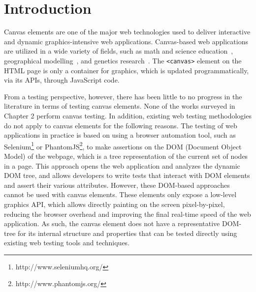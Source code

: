 \section{Introduction}\label{sec:introduction}
Canvas elements are one of the major web technologies used to deliver interactive and dynamic graphics-intensive web applications. Canvas-based web applications are utilized in a wide variety of fields, such as math and science education~\cite{arreola2017creating}, geographical modelling~\cite{christen2012web}, and genetics research~\cite{buels2016jbrowse}. 
The \texttt{<canvas>} element on the HTML page is only a container for graphics, which is updated programmatically, via its APIs, through JavaScript code.

From a testing perspective, however, there has been little to no progress in the literature in terms of testing canvas elements. None of the works surveyed in Chapter 2 perform canvas testing. In addition, existing web testing methodologies do not apply to canvas elements for the following reasons. The testing of web applications in practice is based on using a browser automation tool, such as Selenium\footnote{http://www.seleniumhq.org/} or PhantomJS\footnote{http://www.phantomjs.org/}, to make assertions on the DOM (Document Object Model) of the webpage, which is a tree representation of the current set of nodes in a page. This approach opens the web application and analyzes the dynamic DOM tree, and allows developers to write tests that interact with DOM elements and assert their various attributes. However, these DOM-based approaches cannot be used with canvas elements.  These elements only expose a low-level graphics API, which allows directly painting on the screen pixel-by-pixel, reducing the browser overhead and improving the final real-time speed of the web application.
As such, the canvas element does not have a representative DOM-tree for its internal structure and properties that can be tested directly using existing web testing tools and techniques. 
 
